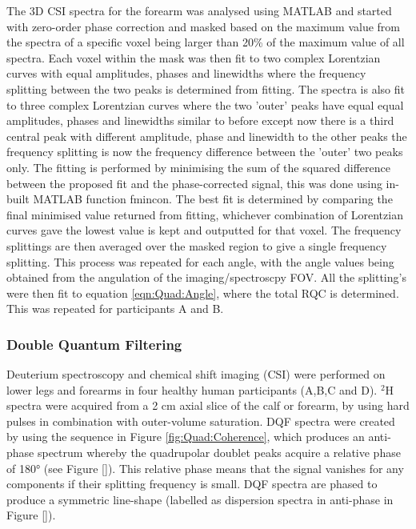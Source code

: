 \documentclass[class=article, crop=false]{standalone}
\begin{document}
The 3D CSI spectra for the forearm was analysed using MATLAB and started with zero-order phase correction and masked based on the maximum value from the spectra of a specific voxel being larger than 20\% of the maximum value of all spectra. Each voxel within the mask was then fit to two complex Lorentzian curves with equal amplitudes, phases and linewidths where the frequency splitting between the two peaks is determined from fitting. The spectra is also fit to three complex Lorentzian curves where the two 'outer' peaks have equal equal amplitudes, phases and linewidths similar to before except now there is a third central peak with different amplitude, phase and linewidth to the other peaks the frequency splitting is now the frequency difference between the 'outer' two peaks only. The fitting is performed by minimising the sum of the squared difference between the proposed fit and the phase-corrected signal, this was done using in-built MATLAB function fmincon. The best fit is determined by comparing the final minimised value returned from fitting, whichever combination of Lorentzian curves gave the lowest value is kept and outputted for that voxel. The frequency splittings are then averaged over the masked region to give a single frequency splitting. This process was repeated for each angle, with the angle values being obtained from the angulation of the imaging/spectroscpy FOV. All the splitting's were then fit to equation \ref{eqn:Quad:Angle}, where the total RQC is determined. This was repeated for participants A and B.

\subsubsection{Double Quantum Filtering}
\label{Chap:Quad:1:DQF}

Deuterium spectroscopy and chemical shift imaging (CSI) were performed on lower legs and forearms in four healthy human participants (A,B,C and D). $^2$H spectra were acquired from a 2 cm axial slice of the calf or forearm, by using hard pulses in combination with outer-volume saturation. DQF spectra were created by using the sequence in Figure \ref{fig:Quad:Coherence}, which produces an anti-phase spectrum whereby the quadrupolar doublet peaks acquire a relative phase of 180° (see Figure \ref{}). This relative phase means that the signal vanishes for any components if their splitting frequency is small. DQF spectra are phased to produce a symmetric line-shape (labelled as dispersion spectra in anti-phase in Figure \ref{}).  
\end{document}
